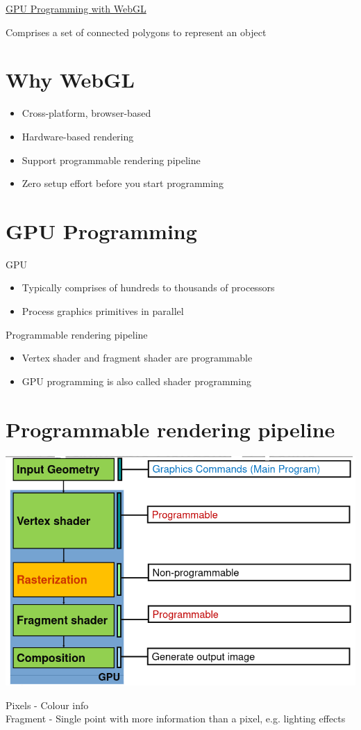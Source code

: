 \documentclass{article}[18pt]
\begin{document}
\begin{center}
\underline{\huge GPU Programming with WebGL}
\end{center}
\begin{defin}
Comprises a set of connected polygons to represent an object
\end{defin}
\section{Why WebGL}
\begin{itemize}
	\item Cross-platform, browser-based
	\item Hardware-based rendering
	\item Support programmable rendering pipeline
	\item Zero setup effort before you start programming
\end{itemize}
\section{GPU Programming}
GPU
\begin{itemize}
	\item Typically comprises of hundreds to thousands of processors
	\item Process graphics primitives in parallel
\end{itemize}
Programmable rendering pipeline
\begin{itemize}
	\item Vertex shader and fragment shader are programmable
	\item GPU programming is also called shader programming
\end{itemize}
\section{Programmable rendering pipeline}
\begin{center}
	\includegraphics[scale=0.7]{pipeline}
\end{center}
Pixels - Colour info\\
Fragment - Single point with more information than a pixel, e.g. lighting effects
\end{document}
